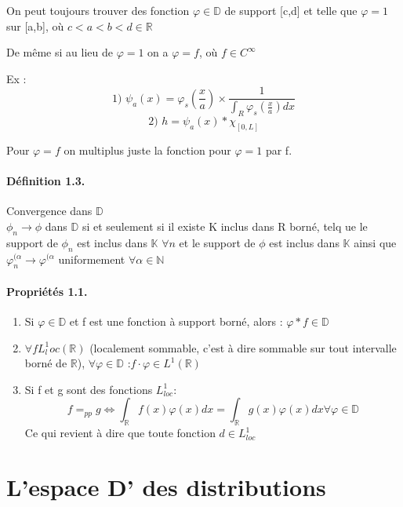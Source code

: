 \documentclass[12pt,a4paper]{report}
\begin{document}
On peut toujours trouver des fonction \(\varphi \in \mathbb{D}\) de support [c,d] et telle que \(\varphi = 1\) sur [a,b], où \(c < a < b < d \in \mathbb{R}\)

De même si au lieu de \(\varphi = 1\) on a \(\varphi = f\), où \(f \in C^{\infty}\)

Ex :  \[\text{1) } \psi_a (x) = \varphi_s \left(\frac{x}{a}\right) \times \frac{1}{\int_R \varphi_s \left(\frac{x}{a}\right) dx}\]
\[
	\text{2) }h = \psi_a (x) * \chi_{[0,L]}
\]

Pour \(\varphi = f\) on multiplus juste la fonction pour \(\varphi = 1\) par f.

\paragraph{Définition 1.3.} Convergence dans \(\mathbb{D}\)\\
\(\phi_n \rightarrow \phi\) dans \(\mathbb{D}\) si et seulement si il existe K inclus dans R borné, telq ue le support de \(\phi_n\) est inclus dans \(\mathbb{K}\) \(\forall n\) et le support de \(\phi\) est inclus dans \(\mathbb{K}\) ainsi que \(\varphi_n^{(\alpha} \rightarrow \varphi^{(\alpha}\) uniformement \(\forall \alpha \in \mathbb{N}\)

\paragraph{Propriétés 1.1.}
\begin{enumerate}
	\item Si \(\varphi \in \mathbb{D}\) et f est une fonction à support borné, alors : \(\varphi * f \in \mathbb{D}\)
	\item \(\forall f L^1_loc(\mathbb{R})\) (localement sommable, c'est à dire sommable sur tout intervalle borné de \(\mathbb{R}\)), \(\forall \varphi \in \mathbb{D}\) :\quad \(f\cdot \varphi \in L^1(\mathbb{R})\)
	\item Si f et g sont des fonctions \(L^1_{loc}\):
	\[
		f =_{pp} g \Leftrightarrow \int_{\mathbb{R}} f(x) \varphi(x) dx = \int_{\mathbb{R}} g(x)  \varphi(x) dx \forall \varphi \in \mathbb{D}
	\]
	Ce qui revient à dire que toute fonction \(d \in L^1_{loc}\)
\end{enumerate}

\section{L'espace D' des distributions}
\end{document}
